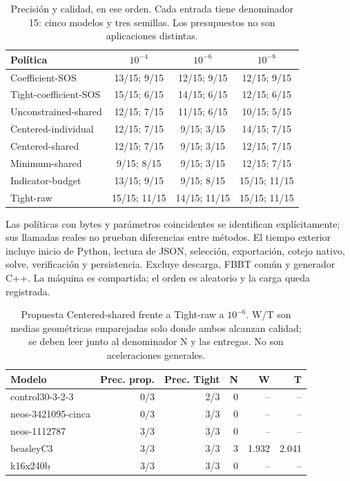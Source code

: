 \documentclass[10pt,a4paper]{article}
\begin{document}
\begin{table}[ht]\centering\small
\caption{Precisión y calidad, en ese orden. Cada entrada tiene denominador 15:
cinco modelos y tres semillas. Los presupuestos no son aplicaciones distintas.}
\begin{tabular}{lccc}\toprule
Política & $10^{-4}$ & $10^{-6}$ & $10^{-8}$\\\midrule
Coefficient-SOS & 13/15; 9/15 & 12/15; 9/15 & 12/15; 9/15 \\
Tight-coefficient-SOS & 15/15; 6/15 & 14/15; 6/15 & 12/15; 6/15 \\
Unconstrained-shared & 12/15; 7/15 & 11/15; 6/15 & 10/15; 5/15 \\
Centered-individual & 12/15; 7/15 & 9/15; 3/15 & 14/15; 7/15 \\
Centered-shared & 12/15; 7/15 & 9/15; 3/15 & 12/15; 7/15 \\
Minimum-shared & 9/15; 8/15 & 9/15; 3/15 & 12/15; 7/15 \\
Indicator-budget & 13/15; 9/15 & 9/15; 8/15 & 15/15; 11/15 \\
Tight-raw & 15/15; 11/15 & 14/15; 11/15 & 15/15; 11/15 \\
\bottomrule\end{tabular}\end{table}

Las políticas con bytes y parámetros coincidentes se identifican explícitamente;
sus llamadas reales no prueban diferencias entre métodos. El tiempo exterior
incluye inicio de Python, lectura de JSON, selección, exportación, cotejo nativo,
solve, verificación y persistencia. Excluye descarga, FBBT común y generador C++.
La máquina es compartida; el orden es aleatorio y la carga queda registrada.

\begin{table}[ht]\centering\small
\caption{Propuesta Centered-shared frente a Tight-raw a $10^{-6}$.
W/T son medias geométricas emparejadas solo donde ambos alcanzan calidad;
se deben leer junto al denominador N y las entregas. No son aceleraciones generales.}
\begin{tabular}{lrrrrr}\toprule
Modelo & Prec. prop. & Prec. Tight & N & W & T\\\midrule
control30-3-2-3 & 0/3 & 2/3 & 0 & -- & -- \\
neos-3421095-cinca & 0/3 & 3/3 & 0 & -- & -- \\
neos-1112787 & 3/3 & 3/3 & 0 & -- & -- \\
beasleyC3 & 3/3 & 3/3 & 3 & 1.932 & 2.041 \\
k16x240b & 3/3 & 3/3 & 0 & -- & -- \\
\bottomrule\end{tabular}\end{table}
\end{document}
